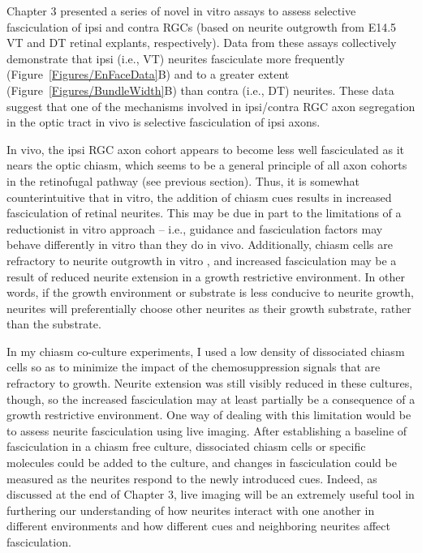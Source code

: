 Chapter 3 presented a series of novel in vitro assays to assess selective fasciculation of ipsi and contra RGCs (based on neurite outgrowth from E14.5 VT and DT retinal explants, respectively).
Data from these assays collectively demonstrate that ipsi (i.e., VT) neurites fasciculate more frequently (Figure~\ref{Figures/EnFaceData}B) and to a greater extent (Figure~\ref{Figures/BundleWidth}B) than contra (i.e., DT) neurites.
These data suggest that one of the mechanisms involved in ipsi/contra RGC axon segregation in the optic tract in vivo is selective fasciculation of ipsi axons.

In vivo, the ipsi RGC axon cohort appears to become less well fasciculated as it nears the optic chiasm, which seems to be a general principle of all axon cohorts in the retinofugal pathway (see previous section).
Thus, it is somewhat counterintuitive that in vitro, the addition of chiasm cues results in increased fasciculation of retinal neurites.
This may be due in part to the limitations of a reductionist in vitro approach -- i.e., guidance and fasciculation factors may behave differently in vitro than they do in vivo.
Additionally, chiasm cells are refractory to neurite outgrowth in vitro \cite{wang1995crossed,wang1996chemosuppression}, and increased fasciculation may be a result of reduced neurite extension in a growth restrictive environment.
In other words, if the growth environment or substrate is less conducive to neurite growth, neurites will preferentially choose other neurites as their growth substrate, rather than the substrate.

In my chiasm co-culture experiments, I used a low density of dissociated chiasm cells so as to minimize the impact of the chemosuppression signals that are refractory to growth.
Neurite extension was still visibly reduced in these cultures, though, so the increased fasciculation may at least partially be a consequence of a growth restrictive environment.
One way of dealing with this limitation would be to assess neurite fasciculation using live imaging.
After establishing a baseline of fasciculation in a chiasm free culture, dissociated chiasm cells or specific molecules could be added to the culture, and changes in fasciculation could be measured as the neurites respond to the newly introduced cues.
Indeed, as discussed at the end of Chapter 3, live imaging will be an extremely useful tool in furthering our understanding of how neurites interact with one another in different environments and how different cues and neighboring neurites affect fasciculation.

